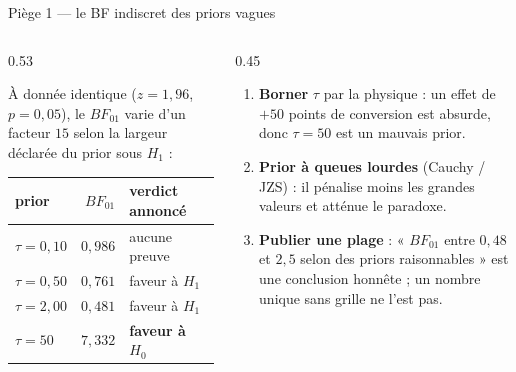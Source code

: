 \begin{frame}{Piège 1 --- le BF indiscret des priors vagues}
\begin{columns}[t]
\begin{column}{0.53\textwidth}
\begin{wbox}
À donnée identique ($z = 1{,}96$, $p = 0{,}05$), le $BF_{01}$ varie d'un
facteur $15$ selon la largeur déclarée du prior sous $H_1$ :
\begin{center}
\begin{tabular}{@{}lrl@{}}
\toprule
prior & $BF_{01}$ & verdict annoncé \\
\midrule
$\tau = 0{,}10$ & $0{,}986$ & aucune preuve \\
$\tau = 0{,}50$ & $0{,}761$ & faveur à $H_1$ \\
$\tau = 2{,}00$ & $0{,}481$ & faveur à $H_1$ \\
$\tau = 50$ & $7{,}332$ & \textbf{faveur à $H_0$} \\
\bottomrule
\end{tabular}
\end{center}
\end{wbox}
\end{column}
\begin{column}{0.45\textwidth}
\begin{kbox}
\begin{enumerate}
  \item \textbf{Borner} $\tau$ par la physique : un effet de $+50$ points
        de conversion est absurde, donc $\tau = 50$ est un mauvais prior.
  \item \textbf{Prior à queues lourdes} (Cauchy / JZS) : il pénalise moins
        les grandes valeurs et atténue le paradoxe.
  \item \textbf{Publier une plage} : « $BF_{01}$ entre $0{,}48$ et $2{,}5$
        selon des priors raisonnables » est une conclusion honnête ;
        un nombre unique sans grille ne l'est pas.
\end{enumerate}
\end{kbox}
\end{column}
\end{columns}
\end{frame}

